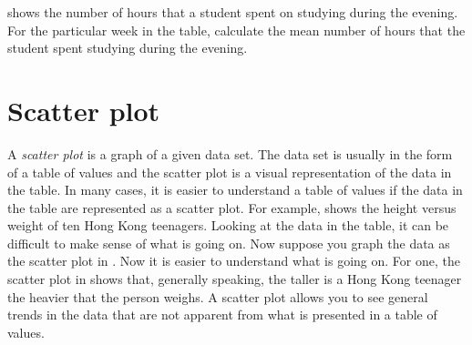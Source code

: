 \documentclass[a4paper,oneside,12pt]{article}
\begin{document}
\begin{exercise}
 shows the number of hours that a student spent
on studying during the evening.  For the particular week in the table,
calculate the mean number of hours that the student spent studying
during the evening.
\end{exercise}



\section{Scatter plot}

A \emph{scatter plot} is a graph of a given data set.  The data set is
usually in the form of a table of values and the scatter plot is a
visual representation of the data in the table.  In many cases, it is
easier to understand a table of values if the data in the table are
represented as a scatter plot.  For example, 
shows the height versus weight of ten Hong Kong teenagers.  Looking at
the data in the table, it can be difficult to make sense of what is
going on.  Now suppose you graph the data as the scatter plot in
.  Now it is easier to
understand what is going on.  For one, the scatter plot in
 shows that, generally speaking,
the taller is a Hong Kong teenager the heavier that the person
weighs.  A scatter plot allows you to see general trends in the data
that are not apparent from what is presented in a table of values.

\begin{table}[!htbp]
\centering

\caption{%
  The height and weight of ten Hong Kong teenagers.  Height is
  measured in centimetres and weight is measured in kilograms.
}
\label{tab:height_weight}
\end{table}
\end{document}
